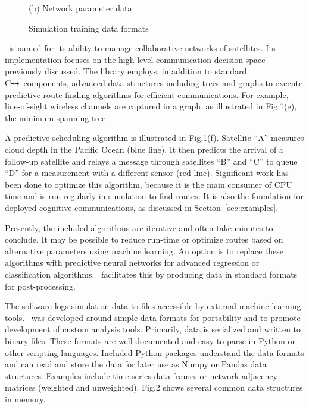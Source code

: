 \documentclass[conference]{IEEEtran}
\newcommand{\project}{{\sc{Collaborate}}~}
\newcommand{\cpp}{C\texttt{++}~}
\begin{document}
\begin{figure}[t]
\begin{minipage}[b]{0.49\linewidth}
\begin{center}
      {\footnotesize(b) Network parameter data}
    \end{center}
  \end{minipage}
  \caption{Simulation training data formats}
  \label{fig:data}
\end{figure}

\project is named for its ability to manage collaborative networks of satellites.  Its implementation focuses on the high-level communication decision space previously discussed.  The library employs, in addition to standard \cpp components, advanced data structures including trees and graphs to execute predictive route-finding algorithms for efficient communications.  For example, line-of-sight wireless channels are captured in a graph, as illustrated in Fig.1(e), the minimum spanning tree.

A predictive scheduling algorithm is illustrated in Fig.1(f).  Satellite ``A'' measures cloud depth in the Pacific Ocean (blue line).  It then predicts the arrival of a follow-up satellite and relays a message through satellites ``B'' and ``C'' to queue ``D'' for a measurement with a different sensor (red line).  Significant work has been done to optimize this algorithm, because it is the main consumer of CPU time and is run regularly in simulation to find routes.  It is also the foundation for deployed cognitive communications, as discussed in Section~\ref{sec:examples}.

Presently, the included algorithms are iterative and often take minutes to conclude.  It may be possible to reduce run-time or optimize routes based on alternative parameters using machine learning.  An option is to replace these algorithms with predictive neural networks for advanced regression or classification algorithms.  \project facilitates this by producing data in standard formats for post-processing.

The software logs simulation data to files accessible by external machine learning tools.  \project was developed around simple data formats for portability and to promote development of custom analysis tools.  Primarily, data is serialized and written to binary files.  These formats are well documented and easy to parse in Python or other scripting languages.  Included Python packages understand the data formats and can read and store the data for later use as Numpy or Pandas data structures.  Examples include time-series data frames or network adjacency matrices (weighted and unweighted).  Fig.2 shows several common data structures in memory.
\end{document}
